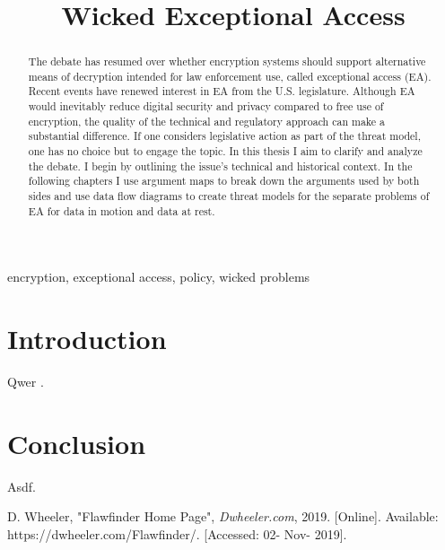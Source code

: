 \documentclass[conference]{IEEEtran}
\begin{document}

\title{Wicked Exceptional Access}

\author{
}

\maketitle



\begin{abstract}

The debate has resumed over whether encryption systems should support alternative means of decryption intended for law
enforcement use, called exceptional access (EA). Recent events have renewed interest in EA from the U.S. legislature.
Although EA would inevitably reduce digital security and privacy compared to free use of encryption, the quality of the
technical and regulatory approach can make a substantial difference. If one considers legislative action as part of the
threat model, one has no choice but to engage the topic. In this thesis I aim to clarify and analyze the debate. I begin
by outlining the issue's technical and historical context. In the following chapters I use argument maps to break down
the arguments used by both sides and use data flow diagrams to create threat models for the separate problems of EA for
data in motion and data at rest.

\end{abstract}

\begin{IEEEkeywords}
encryption, exceptional access, policy, wicked problems
\end{IEEEkeywords}



\section{Introduction}

Qwer \cite{flawfinder}.

\section{Conclusion}

Asdf.


\begin{thebibliography}{00}

 D. Wheeler, "Flawfinder Home Page", \textit{Dwheeler.com}, 2019. [Online].
Available: https://dwheeler.com/Flawfinder/. [Accessed: 02- Nov- 2019].

\end{thebibliography}
\end{document}
